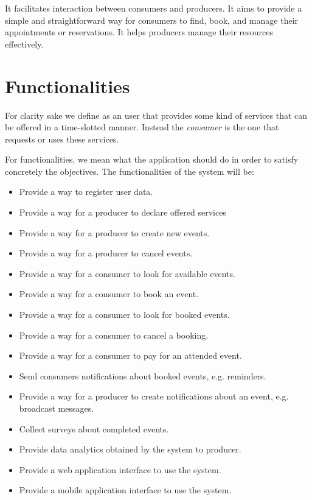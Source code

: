 \documentclass{article}
\begin{document}
It facilitates interaction between consumers and producers. It aims to provide
a simple and straightforward way for consumers to find, book, and manage their
appointments or reservations. It helps producers manage their resources
effectively.

\section{Functionalities}

For clarity sake we define as  an user that provides some
kind of services that can be offered in a time-slotted manner. Instead the
\emph{consumer} is the one that requests or uses these services.

For functionalities, we mean what the application should do in order to satisfy
concretely the objectives. The functionalities of the system will be:
\begin{itemize}
    \item Provide a way to register user data.
    \item Provide a way for a producer to declare offered services
    \item Provide a way for a producer to create new events.
    \item Provide a way for a producer to cancel events.
    \item Provide a way for a consumer to look for available events.
    \item Provide a way for a consumer to book an event.
    \item Provide a way for a consumer to look for booked events.
    \item Provide a way for a consumer to cancel a booking.
    \item Provide a way for a consumer to pay for an attended event.
    \item Send consumers notifications about booked events, e.g. reminders.
    \item Provide a way for a producer to create notifications about an event,
	e.g. broadcast messages. 
    \item Collect surveys about completed events.
    \item Provide data analytics obtained by the system to producer.
    \item Provide a web application interface to use the system.
    \item Provide a mobile application interface to use the system.
\end{itemize}
\end{document}
